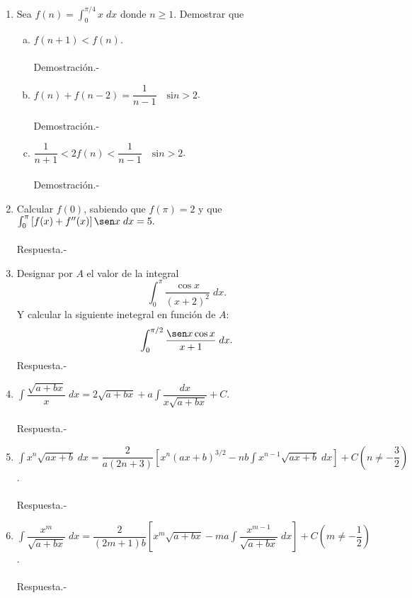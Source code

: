 \begin{enumerate}[\bfseries 1.]
    \item Sea $f(n)=\int_0^{\pi/4}x\; dx$ donde $n\geq 1$. Demostrar que

    \begin{enumerate}[(a)]

	\item $f(n+1)<f(n)$.\\\\
	    Demostración.-\;

	\item $f(n)+f(n-2)=\dfrac{1}{n-1}\quad \mbox{si} n>2$.\\\\
	    Demostración.-\;

	\item $\dfrac{1}{n+1}<2f(n)<\dfrac{1}{n-1}\quad \mbox{si} n>2$.\\\\
	    Demostración.-\;

    \end{enumerate}

    \item Calcular $f(0)$, sabiendo que $f(\pi)=2$ y que $\int_0^\pi \left[f(x)+f''(x)\right]\sen x\; dx = 5.$\\\\
	Respuesta.-\;

    \item Designar por $A$ el valor de la integral
    $$\int_0^\pi \dfrac{\cos x}{\left(x+2\right)^2}\; dx.$$
    Y calcular la siguiente inetegral en función de $A$:
    $$\int_0^{\pi/2}\dfrac{\sen x\cos x}{x+1}\; dx.$$
	Respuesta.-\;

    \item $\displaystyle\int \dfrac{\sqrt{a+bx}}{x}\; dx = 2\sqrt{a+bx}+a\int \dfrac{dx}{x\sqrt{a+bx}}+C$.\\\\
	Respuesta.-\;

    \item $\displaystyle\int x^n \sqrt{ax+b}\; dx = \dfrac{2}{a(2n+3)}\left[x^n(ax+b)^{3/2}-nb\int x^{n-1}\sqrt{ax+b}\; dx\right]+C\left(n\neq -\dfrac{3}{2}\right)$.\\\\
	Respuesta.-\;

    \item $\displaystyle\int \dfrac{x^m}{\sqrt{a+bx}}\; dx = \dfrac{2}{(2m+1)b}\left[x^m \sqrt{a+bx}-ma\int \dfrac{x^{m-1}}{\sqrt{a+bx}}\; dx\right]+C \left(m\neq -\dfrac{1}{2}\right)$.\\\\
	Respuesta.-\;


\end{enumerate}
